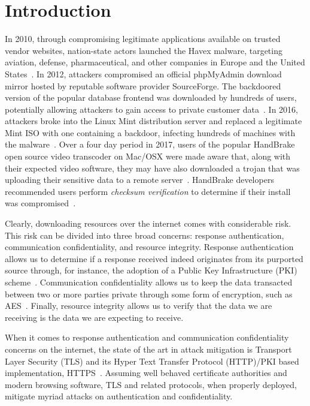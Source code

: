 \section{Introduction} \label{sec:introduction}

In 2010, through compromising legitimate applications available on trusted
vendor websites, nation-state actors launched the Havex malware, targeting
aviation, defense, pharmaceutical, and other companies in Europe and the United
States~\cite{SCA-HAVEX1, SCA-HAVEX2}. In 2012, attackers compromised an official
phpMyAdmin download mirror hosted by reputable software provider SourceForge.
The backdoored version of the popular database frontend was downloaded by
hundreds of users, potentially allowing attackers to gain access to private
customer data~\cite{SCA-PMA1, SCA-PMA2}. In 2016, attackers broke into the Linux
Mint distribution server and replaced a legitimate Mint ISO with one containing
a backdoor, infecting hundreds of machines with the malware~\cite{SCA-MINT1,
SCA-MINT2}. Over a four day period in 2017, users of the popular HandBrake open
source video transcoder on Mac/OSX were made aware that, along with their
expected video software, they may have also downloaded a trojan that was
uploading their sensitive data to a remote server~\cite{SCA-HB1}. HandBrake
developers recommended users perform \emph{checksum verification} to determine
if their install was compromised~\cite{SCA-HB2}.

Clearly, downloading resources over the internet comes with considerable risk.
This risk can be divided into three broad concerns: response authentication,
communication confidentiality, and resource integrity. Response authentication
allows us to determine if a response received indeed originates from its
purported source through, for instance, the adoption of a Public Key
Infrastructure (PKI) scheme~\cite{PKI}. Communication confidentiality allows us
to keep the data transacted between two or more parties private through some
form of encryption, such as AES~\cite{AES}. Finally, resource integrity allows
us to verify that the data we are receiving is the data we are expecting to
receive.

When it comes to response authentication and communication confidentiality
concerns on the internet, the state of the art in attack mitigation is Transport
Layer Security (TLS) and its Hyper Text Transfer Protocol (HTTP)/PKI based
implementation, HTTPS~\cite{TLS1.2, TLS1, TLS0, HTTPS, PKI}. Assuming well
behaved certificate authorities and modern browsing software, TLS and related
protocols, when properly deployed, mitigate myriad attacks on authentication and
confidentiality.

